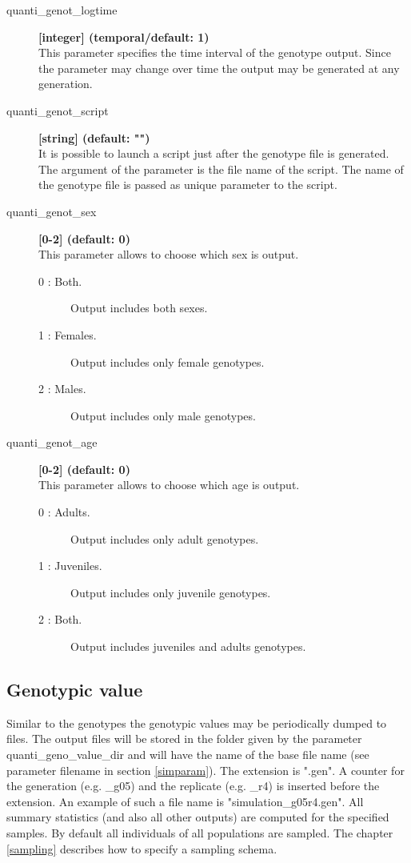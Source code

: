 \documentclass[letterpaper,12pt,oneside]{book}
\begin{document}
\begin{description}
\item[quanti\_genot\_logtime] \textbf{[integer] (temporal/default: 1)}\\
This parameter specifies the time interval of the genotype output. Since the parameter may change over time the output may be generated at any generation.

\item[quanti\_genot\_script] \textbf{[string] (default: "")}\\
It is possible to launch a script just after the genotype file is generated. The argument of the parameter is the file name of the script. The name of the genotype file is passed as unique parameter to the script. 

\item[quanti\_genot\_sex] \textbf{[0-2] (default: 0)}\\
This parameter allows to choose which sex is output. 
\begin{description}
\item [0 : Both.] Output includes both sexes.
\item [1 : Females.] Output includes only female genotypes.
\item [2 : Males.] Output includes only male genotypes.
\end{description}

\item[quanti\_genot\_age] \textbf{[0-2] (default: 0)}\\
This parameter allows to choose which age is output.  
\begin{description}
\item [0 : Adults.] Output includes only adult genotypes.
\item [1 : Juveniles.] Output includes only juvenile genotypes.
\item [2 : Both.] Output includes juveniles and adults genotypes.
\end{description}


\end{description}



\subsection{Genotypic value}\label{genoValQuanti}
Similar to the genotypes the genotypic values may be periodically dumped to files. The output files will be stored in the folder given by the parameter \textsf{quanti\_geno\_value\_dir} and will have the name of the base file name (see parameter \textsf{filename} in section \ref{simparam}). The extension is ".gen". A counter for the generation (e.g. \_g05) and the replicate (e.g. \_r4) is inserted before the extension. An example of such a file name is \textsf{"simulation\_g05r4.gen"}. All summary statistics (and also all other outputs) are computed for the specified samples. By default all individuals of all populations are sampled. The chapter \ref{sampling} describes how to specify a sampling schema.
\end{document}
